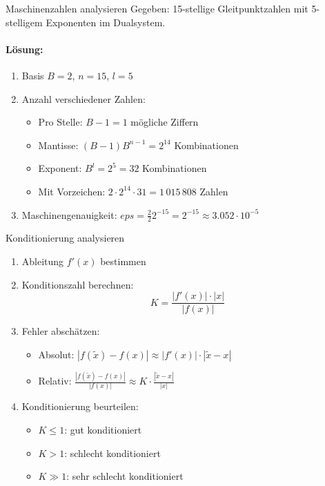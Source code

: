 \begin{example2}{Maschinenzahlen analysieren}
Gegeben: 15-stellige Gleitpunktzahlen mit 5-stelligem Exponenten im Dualsystem.

\paragraph{Lösung:}
\begin{enumerate}
    \item Basis $B=2$, $n=15$, $l=5$
    \item Anzahl verschiedener Zahlen:
    \begin{itemize}
        \item Pro Stelle: $B-1=1$ mögliche Ziffern
        \item Mantisse: $(B-1)B^{n-1} = 2^{14}$ Kombinationen
        \item Exponent: $B^l = 2^5 = 32$ Kombinationen
        \item Mit Vorzeichen: $2 \cdot 2^{14} \cdot 31 = 1\,015\,808$ Zahlen
    \end{itemize}
    \item Maschinengenauigkeit:
    $eps = \frac{2}{2}2^{-15} = 2^{-15} \approx 3.052 \cdot 10^{-5}$
\end{enumerate}
\end{example2}

\begin{KR}{Konditionierung analysieren}
\begin{enumerate}
    \item Ableitung $f'(x)$ bestimmen
    \item Konditionszahl berechnen:
    $$K = \frac{|f'(x)| \cdot |x|}{|f(x)|}$$
    \item Fehler abschätzen:
    \begin{itemize}
        \item Absolut: $|f(\tilde{x})-f(x)| \approx |f'(x)| \cdot |\tilde{x}-x|$
        \item Relativ: $\frac{|f(\tilde{x})-f(x)|}{|f(x)|} \approx K \cdot \frac{|\tilde{x}-x|}{|x|}$
    \end{itemize}
    \item Konditionierung beurteilen:
    \begin{itemize}
        \item $K \leq 1$: gut konditioniert
        \item $K > 1$: schlecht konditioniert
        \item $K \gg 1$: sehr schlecht konditioniert
    \end{itemize}
\end{enumerate}
\end{KR}

